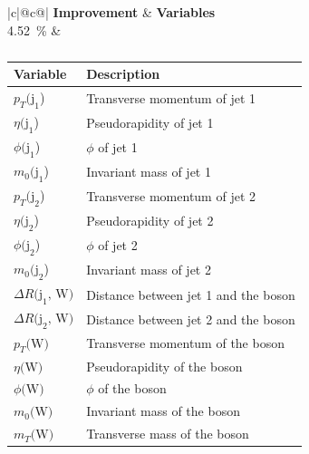 \begin{table}[h]
    \centering
    \label{tab:app_vars_4}
    \caption{}
    \begin{tabular}{ |c|@{}c@{}| }
        \hline
        \textbf{Improvement} & \textbf{Variables}\\
        \hline
        \SI{4.52}{\%} & 
        \begin{tabular}{ll}
            \hline
            Variable & Description\\
            \hline
            $p_T\text{(j}_\text{1}$) & Transverse momentum of jet 1\\
            $\eta\text{(j}_\text{1}$) & Pseudorapidity of jet 1\\
            $\phi\text{(j}_\text{1}$) & $\phi$ of jet 1\\
            $m_0\text{(j}_\text{1}$) & Invariant mass of jet 1\\

            $p_T\text{(j}_\text{2}$) & Transverse momentum of jet 2\\
            $\eta\text{(j}_\text{2}$) & Pseudorapidity of jet 2\\
            $\phi\text{(j}_\text{2}$) & $\phi$ of jet 2\\
            $m_0\text{(j}_\text{2}$) & Invariant mass of jet 2\\

            $\Delta R\text{(j}_\text{1}\text{, W)}$ & Distance between jet 1 and the \PWplus boson\\
            $\Delta R\text{(j}_\text{2}\text{, W)}$ & Distance between jet 2 and the \PWplus boson\\

            $p_T\text{(W)}$ & Transverse momentum of the \PWplus boson\\
            $\eta\text{(W)}$ & Pseudorapidity of the \PWplus boson\\
            $\phi\text{(W)}$ & $\phi$ of the \PWplus boson\\
            $m_0\text{(W)}$ & Invariant mass of the \PWplus boson\\
            $m_T\text{(W)}$ & Transverse mass of the \PWplus boson\\
            \hline
        \end{tabular}\\
        \hline
    \end{tabular}
\end{table}

